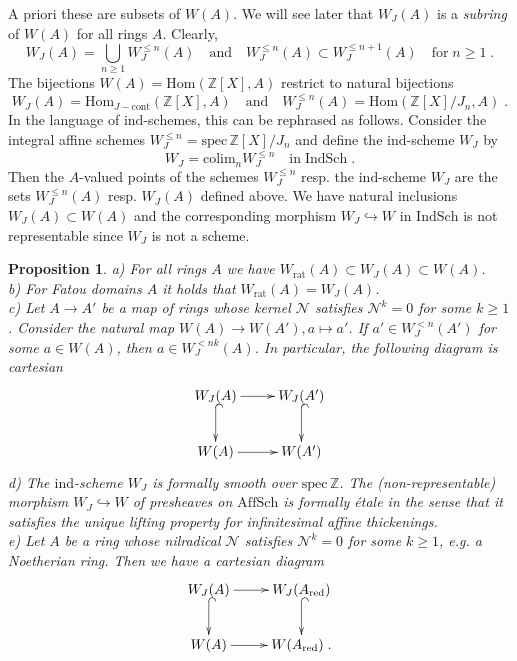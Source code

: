 \documentclass[12pt,leqno]{article}
\newcommand{\Z}{{\mathbb{Z}}}
\newcommand{\red}{\mathrm{red}}
\newcommand{\spec}{\mathrm{spec}\,}
\newcommand{\Hom}{\mathrm{Hom}}
\newcommand{\ind}{\mathrm{ind}}
\newcommand{\rat}{\mathrm{rat}}
\newcommand{\Nh}{{\mathcal N}}
\newcommand{\colim}{\mathrm{colim}}
\newcommand{\Affsch}{\mathrm{AffSch}}
\newcommand{\Indsch}{\mathrm{IndSch}}
\newtheorem{prop}[theorem]{Proposition}
\begin{document}
A priori these are subsets of $W (A)$. We will see later that $W_J (A)$ is a \textit{subring} of $W (A)$ for all rings $A$. Clearly, 
\[
W_J (A) = \bigcup_{n \ge 1} W^{\le n}_J (A) \quad \text{and} \quad W^{\le n}_J (A) \subset W^{\le n+1}_J (A) \quad \text{for} \; n \ge 1 \; .
\]
The bijections $W (A) = \Hom (\Z [X] , A)$ restrict to natural bijections
\begin{equation}
\label{eq:10}
W_J (A) = \Hom_{J-\text{cont}} (\Z [X] , A) \quad \text{and} \quad W^{\le n}_J (A) = \Hom (\Z [X] / J_n , A) \; .
\end{equation}
In the language of $\ind$-schemes, this can be rephrased as follows. Consider the integral affine schemes $W^{\le n}_J = \spec \Z [X] / J_n$ and define the $\ind$-scheme $W_J$ by
\[
W_J = \colim_n W^{\le n}_J \quad \text{in} \; \Indsch \; .
\]
Then the $A$-valued points of the schemes $W^{\le n}_J$ resp. the $\ind$-scheme $W_J$ are the sets $W^{\le n}_J (A)$ resp. $W_J (A)$ defined above. We have natural inclusions $W_J (A) \subset W (A)$ and the corresponding morphism $W_J \hookrightarrow W$ in $\Indsch$ is not representable since $W_J$ is not a scheme.

\begin{prop}
\label{t2.1} 
a) For all rings $A$ we have $W_{\rat} (A) \subset W_J (A) \subset W (A)$. \\
b) For Fatou domains $A$ it holds that $W_{\rat} (A) = W_J (A)$.\\
c) Let $A \to A'$ be a map of rings whose kernel $\Nh$ satisfies $\Nh^k = 0$ for some $k \ge 1$. Consider the natural map $W (A) \to W (A') , a \mapsto a'$. If $a' \in W^{< n}_J (A')$ for some $a \in W (A)$, then $a \in W^{< nk}_J (A)$. In particular, the following diagram is cartesian
\[
\xymatrix{
W_J (A) \ar[r]\ar@{^{(}->}[d] & W_J (A') \ar@{^{(}->}[d] \\
W (A) \ar[r] & W (A')
}
\]
d) The $\ind$-scheme $W_J$ is formally smooth over $\spec \Z$. The (non-representable) morphism $W_J \hookrightarrow W$ of presheaves on $\Affsch$ is formally \'etale in the sense that it satisfies the unique lifting property for infinitesimal affine thickenings.\\
e) Let $A$ be a ring whose nilradical $\Nh$ satisfies $\Nh^k = 0$ for some $k \ge 1$, e.g. a Noetherian ring. Then we have a cartesian diagram
\[
\xymatrix{
W_J (A)  \ar[r] \ar@{^{(}->}[d] & W_J (A_{\red}) \ar@{^{(}->}[d]\\
W (A) \ar[r] & W (A_{\red}) \; .
}
\]
\end{prop}
\end{document}
